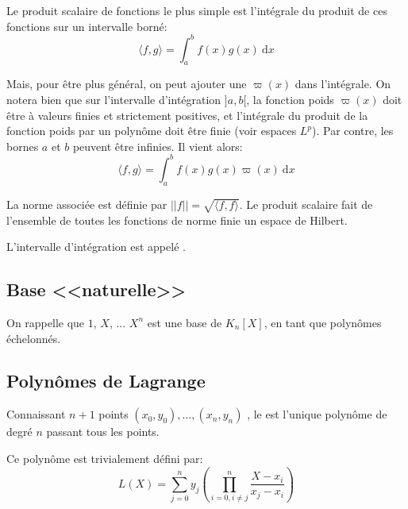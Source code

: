 \medskip
Le produit scalaire de fonctions le plus simple est l'intégrale du produit de ces fonctions
sur un intervalle borné:
\begin{equation}
    \langle f,g \rangle=\int_a^b f(x)g(x)~\mathrm dx
\end{equation}

\medskip
Mais, pour être plus général, on peut ajouter une  $\varpi(x)$ dans 
l'intégrale.
On notera bien que sur l'intervalle d'intégration $]a,b[$, la fonction poids $\varpi(x)$ doit être à 
valeurs finies et strictement positives, et l'intégrale du produit de la fonction poids par un polynôme 
doit être finie (voir espaces $L^p$).
Par contre, les bornes $a$ et $b$ peuvent être infinies.
Il vient alors:
\begin{equation}
    \langle f,g \rangle=\int_a^b f(x)g(x)\varpi(x)~\mathrm dx
\end{equation}

La norme associée est définie par $||f||=\sqrt{\langle f,f \rangle}$.
Le produit scalaire fait de l'ensemble de toutes les fonctions de norme finie un 
espace de Hilbert.

L'intervalle d'intégration est appelé .




\medskip
\subsection{Base <<naturelle>>}

On rappelle que $1$, $X$, ... $X^n$ est une base de $K_n[X]$, en tant que
polynômes échelonnés.



\medskip
\subsection{Polynômes de Lagrange}

Connaissant $n + 1$ points $(x_0, y_0),\dots,(x_n, y_n)$ , le 
est l'unique polynôme de degré $n$
passant tous les points.

Ce polynôme est trivialement défini par:
\begin{equation}
L(X) = \sum_{j=0}^{n} y_j \left( \prod_{i=0, i\neq j}^{n} \frac{X-x_i}{x_j-x_i} \right) 
\end{equation}

